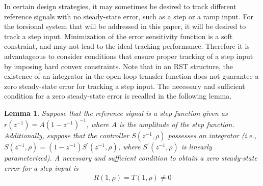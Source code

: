 \documentclass[a4paper, 10pt, conference]{ieeeconf}
\newtheorem{lemma}{Lemma}
\begin{document}

In certain design strategies, it may sometimes be desired to track different reference signals with no steady-state error, such as a step or a ramp input. For the torsional system that will be addressed in this paper, it will be desired to track a step input. Minimization of the error sensitivity function is a soft constraint, and may not lead to the ideal tracking performance. Therefore it is advantageous to consider conditions that ensure proper tracking of a step input by imposing hard convex constraints. Note that in an RST structure, the existence of an integrator in the open-loop transfer function does not guarantee a zero steady-state error for tracking a step input. The necessary and sufficient condition for a zero steady-state error is recalled in the following lemma. 

\begin{lemma}
Suppose that the reference signal is a step function given as $r(z^{-1}) = A(1-z^{-1})^{-1}$, where $A$ is the amplitude of the step function. Additionally, suppose that the controller $S(z^{-1},\rho)$ possesses an integrator (i.e., $S(z^{-1},\rho) = (1-z^{-1}) S^{\prime}(z^{-1},\rho)$, where $S^{\prime}(z^{-1},\rho)$ is linearly parameterized). A necessary and sufficient condition to obtain a zero steady-state error for a step input is
\begin{align} \label{eq:step_con}
R(1,\rho) = T(1,\rho) \neq 0
\end{align}
\end{lemma}
\end{document}

